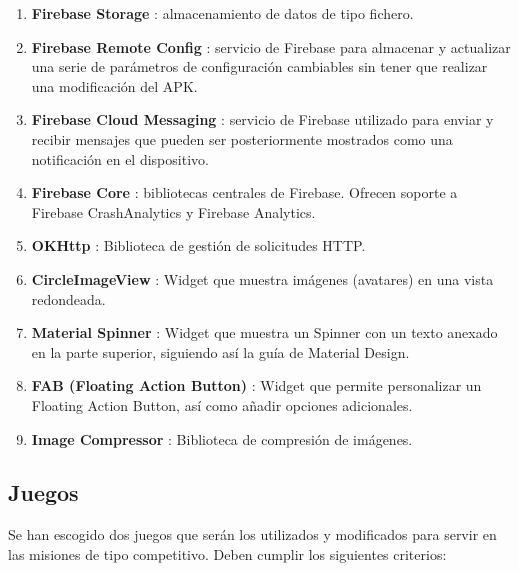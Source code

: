 \documentclass[twoside]{report}
\begin{document}
\begin{enumerate}
\item \textbf{Firebase Storage} \cite{fstoragedependencies}: almacenamiento de datos de tipo fichero.

\item \textbf{Firebase Remote Config} \cite{fremoteconfigdependencies}: servicio de Firebase para almacenar y actualizar una serie de parámetros de configuración cambiables sin tener que realizar una modificación del APK.

\item \textbf{Firebase Cloud Messaging} \cite{fcmessagingdependencies}: servicio de Firebase utilizado para enviar y recibir mensajes que pueden ser posteriormente mostrados como una notificación en el dispositivo.

\item \textbf{Firebase Core} \cite{fcanalyticsdependencies}: bibliotecas centrales de Firebase. Ofrecen soporte a Firebase CrashAnalytics y Firebase Analytics.

\item \textbf{OKHttp} \cite{okhttpdependencies}: Biblioteca de gestión de solicitudes HTTP.

\item \textbf{CircleImageView} \cite{circleimagevdependencies}: Widget que muestra imágenes (avatares) en una vista redondeada.

\item \textbf{Material Spinner} \cite{materialspinnerdependencies}: Widget que muestra un Spinner con un texto anexado en la parte superior, siguiendo así la guía de Material Design.

\item \textbf{FAB (Floating Action Button)} \cite{fabdependencies}: Widget que permite personalizar un Floating Action Button, así como añadir opciones adicionales.

\item \textbf{Image Compressor} \cite{icompressordependencies}: Biblioteca de compresión de imágenes.

\end{enumerate}

\subsection{Juegos}

Se han escogido dos juegos que serán los utilizados y modificados para servir en las misiones de tipo competitivo. Deben cumplir los siguientes criterios:
\end{document}
